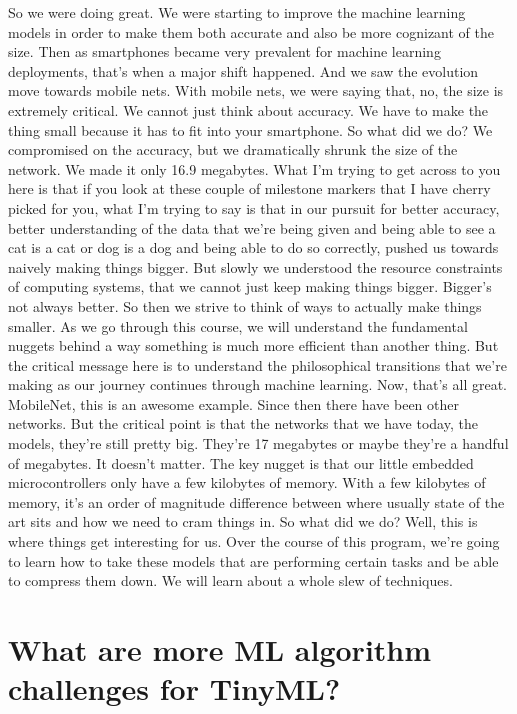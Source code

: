 So we were doing great.
We were starting to improve the machine learning models
in order to make them both accurate and also be more cognizant of the size.
Then as smartphones became very prevalent
for machine learning deployments, that's when a major shift happened.
And we saw the evolution move towards mobile nets.
With mobile nets, we were saying that, no, the size is extremely critical.
We cannot just think about accuracy.
We have to make the thing small because it has to fit into your smartphone.
So what did we do?
We compromised on the accuracy, but we dramatically
shrunk the size of the network.
We made it only 16.9 megabytes.
What I'm trying to get across to you here
is that if you look at these couple of milestone markers
that I have cherry picked for you, what I'm trying to say
is that in our pursuit for better accuracy, better understanding
of the data that we're being given and being
able to see a cat is a cat or dog is a dog and being able to do so correctly,
pushed us towards naively making things bigger.
But slowly we understood the resource constraints of computing systems,
that we cannot just keep making things bigger.
Bigger's not always better.
So then we strive to think of ways to actually make things smaller.
As we go through this course, we will understand
the fundamental nuggets behind a way something
is much more efficient than another thing.
But the critical message here is to understand
the philosophical transitions that we're making as our journey continues
through machine learning.
Now, that's all great.
MobileNet, this is an awesome example.
Since then there have been other networks.
But the critical point is that the networks
that we have today, the models, they're still pretty big.
They're 17 megabytes or maybe they're a handful of megabytes.
It doesn't matter.
The key nugget is that our little embedded microcontrollers only
have a few kilobytes of memory.
With a few kilobytes of memory, it's an order
of magnitude difference between where usually state of the art sits
and how we need to cram things in.
So what did we do?
Well, this is where things get interesting for us.
Over the course of this program, we're going
to learn how to take these models that are performing certain tasks
and be able to compress them down.
We will learn about a whole slew of techniques.



\section{What are more ML algorithm challenges for TinyML?}


